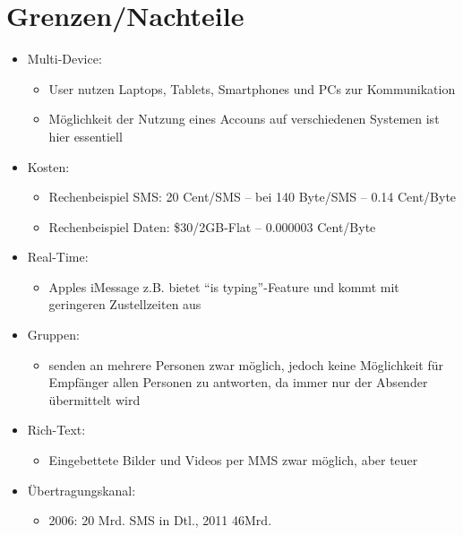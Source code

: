 \documentclass[german,11pt,a4paper]{article}
\begin{document}
\section{Grenzen/Nachteile}
\begin{itemize}
	\item Multi-Device:
		\begin{itemize}
			\item User nutzen Laptops, Tablets, Smartphones und PCs zur Kommunikation
			\item Möglichkeit der Nutzung eines Accouns auf verschiedenen Systemen ist hier 
				essentiell
		\end{itemize}
	\item Kosten:
		\begin{itemize}
			\item Rechenbeispiel SMS: 20 Cent/SMS -- bei 140 Byte/SMS -- 0.14 Cent/Byte
			\item Rechenbeispiel Daten: \$30/2GB-Flat -- 0.000003 Cent/Byte
		\end{itemize}
	\item Real-Time:
		\begin{itemize}
			\item Apples iMessage z.B. bietet ``is typing''-Feature und kommt mit 
				geringeren Zustellzeiten aus
		\end{itemize}
	\item Gruppen:
		\begin{itemize}
			\item senden an mehrere Personen zwar möglich, jedoch keine Möglichkeit 
				für Empfänger allen Personen zu antworten, da immer nur der Absender 
				übermittelt wird 
		\end{itemize}
	\item Rich-Text:
		\begin{itemize}
			\item Eingebettete Bilder und Videos per MMS zwar möglich, aber teuer
		\end{itemize}
	\item Übertragungskanal:
		\begin{itemize}
			\item 2006: 20 Mrd. SMS in Dtl., 2011 46Mrd.
		\end{itemize}
\end{itemize}
\end{document}
